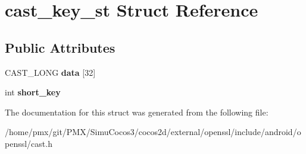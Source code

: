 \hypertarget{structcast__key__st}{}\section{cast\+\_\+key\+\_\+st Struct Reference}
\label{structcast__key__st}
\subsection*{Public Attributes}
\begin{DoxyCompactItemize}
\item 
\mbox{\label{structcast__key__st_a898d08b10239d501f566c1015fa911a5}} 
C\+A\+S\+T\+\_\+\+L\+O\+NG {\bfseries data} \mbox{[}32\mbox{]}
\item 
\mbox{\label{structcast__key__st_a34043464743188eea278cc583540db15}} 
int {\bfseries short\+\_\+key}
\end{DoxyCompactItemize}


The documentation for this struct was generated from the following file\+:\begin{DoxyCompactItemize}
\item 
/home/pmx/git/\+P\+M\+X/\+Simu\+Cocos3/cocos2d/external/openssl/include/android/openssl/cast.\+h\end{DoxyCompactItemize}
